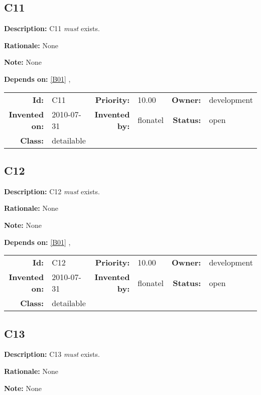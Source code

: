 \subsection{C11}\label{C11}
\textbf{Description:} C11 \textsl{must} exists.

\textbf{Rationale:} None

\textbf{Note:} None

\textbf{Depends on:} \ref{B01} , 

\par
{\small \begin{center}\begin{tabular}{rlrlrl}
\textbf{Id:} & C11 & \textbf{Priority:} & 10.00 & \textbf{Owner:} & development \\ 
\textbf{Invented on:} & 2010-07-31 & \textbf{Invented by:} & flonatel & \textbf{Status:} & open \\ 
\textbf{Class:} & detailable & & & & \\ 
\end{tabular}\end{center} }%
\subsection{C12}\label{C12}
\textbf{Description:} C12 \textsl{must} exists.

\textbf{Rationale:} None

\textbf{Note:} None

\textbf{Depends on:} \ref{B01} , 

\par
{\small \begin{center}\begin{tabular}{rlrlrl}
\textbf{Id:} & C12 & \textbf{Priority:} & 10.00 & \textbf{Owner:} & development \\ 
\textbf{Invented on:} & 2010-07-31 & \textbf{Invented by:} & flonatel & \textbf{Status:} & open \\ 
\textbf{Class:} & detailable & & & & \\ 
\end{tabular}\end{center} }%
\subsection{C13}\label{C13}
\textbf{Description:} C13 \textsl{must} exists.

\textbf{Rationale:} None

\textbf{Note:} None

